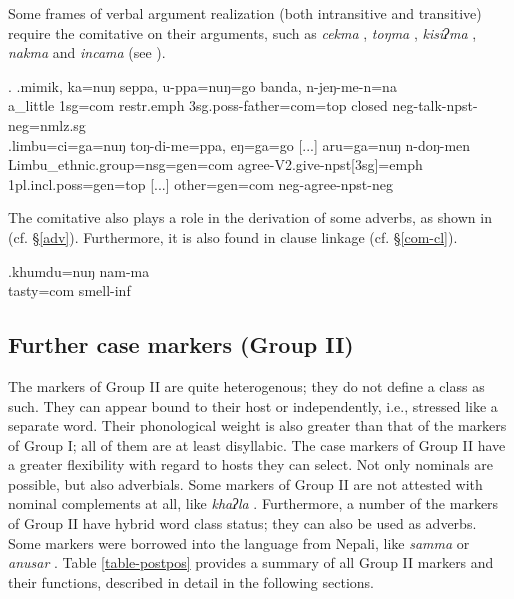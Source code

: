 Some frames of verbal argument realization (both intransitive and transitive) require the comitative on their arguments, such as \emph{cekma} , \emph{toŋma} , \emph{kisiʔma} , \emph{nakma}  and \emph{incama}  (see \Next).		
				
		\ex. \ag.mimik,   ka=nuŋ    seppa,         u-ppa=nuŋ=go                   banda, n-jeŋ-me-n=na\\
		a\_little {\sc 1sg=com} {\sc restr.emph} {\sc 3sg.poss-}father{\sc =com=top} closed {\sc neg-}talk{\sc [3sg]-npst-neg=nmlz.sg}\\
		 
 	\bg.limbu=ci=ga=nuŋ                  toŋ-di-me=ppa,                     eŋ=ga=go [...] aru=ga=nuŋ        n-doŋ-men\\
			Limbu\_ethnic.group{\sc =nsg=gen=com}  agree{\sc -V2.give-npst[3sg]=emph} {\sc 1pl.incl.poss=gen=top} [...] other{\sc =gen=com} {\sc neg-}agree{\sc [3sg]-npst-neg}\\
		 
	

		
The comitative also plays a role in the derivation of some adverbs, as shown in \Next (cf.  §\ref{adv}). Furthermore, it is also found in clause linkage (cf.  §\ref{com-cl}).


\exg.khumdu=nuŋ nam-ma\\
			tasty{\sc =com} smell{\sc -inf}\\


\subsection{Further case markers (Group II)}\label{postpos}
  
The markers of Group II are quite heterogenous; they do not define a class as such. They can appear bound to their host or independently, i.e., stressed like a separate word. Their phonological weight is also greater than that of the markers of Group I; all of them are at least disyllabic.  The case markers of Group II  have a greater flexibility with regard to hosts they can select. Not only nominals are possible, but also adverbials. Some markers of Group II  are not attested with nominal complements at all, like \emph{khaʔla} .  Furthermore, a number of the markers of Group II have hybrid word class status; they can also be used as adverbs. Some markers were borrowed into the language from Nepali, like \emph{samma}  or \emph{anusar} .  Table \ref{table-postpos} provides a summary of all Group II markers and their functions, described in detail in the following sections.
 
